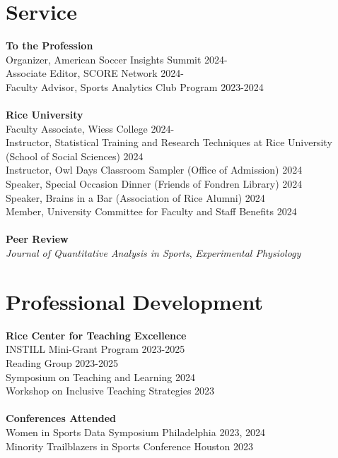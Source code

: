 \documentclass{article}
\begin{document}
\section*{\sc Service}

{\bf To the Profession}\\
Organizer, American Soccer Insights Summit \hfill 2024-\\
Associate Editor, SCORE Network \hfill 2024-\\
Faculty Advisor, Sports Analytics Club Program \hfill 2023-2024\\
~\\
{\bf Rice University}\\
Faculty Associate, Wiess College \hfill 2024-\\
Instructor, Statistical Training and Research Techniques at Rice University \hfill (School of Social Sciences) \hfill 2024\\
Instructor, Owl Days Classroom Sampler (Office of Admission) \hfill 2024\\
Speaker, Special Occasion Dinner (Friends of Fondren Library) \hfill 2024\\
Speaker, Brains in a Bar (Association of Rice Alumni) \hfill 2024\\
Member, University Committee for Faculty and Staff Benefits \hfill 2024\\
~\\
{\bf Peer Review}\\
{\it Journal of Quantitative Analysis in Sports}, {\it Experimental Physiology}

\section*{\sc Professional Development}

{\bf Rice Center for Teaching Excellence}\\
INSTILL Mini-Grant Program \hfill 2023-2025\\
Reading Group \hfill 2023-2025\\
Symposium on Teaching and Learning \hfill 2024\\
Workshop on Inclusive Teaching Strategies \hfill 2023\\
~\\
{\bf Conferences Attended}\\
Women in Sports Data Symposium \hfill Philadelphia 2023, 2024\\
Minority Trailblazers in Sports Conference \hfill Houston 2023
\end{document}
